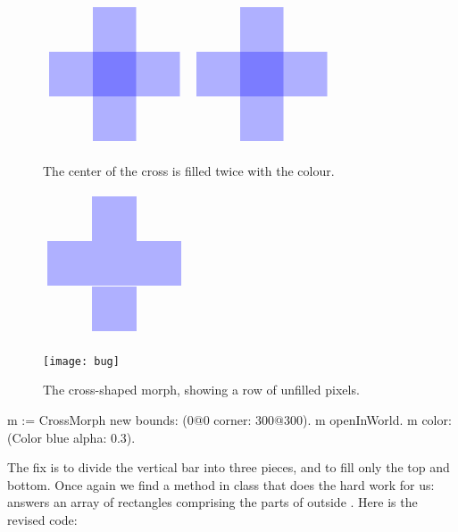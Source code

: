 \documentclass[a4paper,10pt,twoside]{book}
\begin{document}
\begin{figure}[t]
\begin{minipage}{0.48\textwidth}
	\ifluluelse
		{\centerline{\includegraphics[scale=0.6]{overdrawBug}}}
		{\centerline{\includegraphics{overdrawBug}}}
	\caption{The center of the cross is filled twice with the colour.
		\label{fig:overdrawBug}}
\end{minipage}
\hfill
\begin{minipage}{0.48\textwidth}
	\ifluluelse
		{\centerline{\includegraphics[scale=0.6]{hairlineBug}}}
		{\centerline{\texttt{[image: bug]}}}
	\caption{The cross-shaped morph, showing a row of unfilled pixels.
		\label{fig:bug}}
\end{minipage}
\end{figure}


\begin{code}{}
m := CrossMorph new bounds: (0@0 corner: 300@300).
m openInWorld.
m color: (Color blue alpha: 0.3).

\end{code}

\noindent
The fix is to divide the vertical bar into three pieces, and to fill only the top and bottom.  
Once again we find a method in class  that does the hard work for us:  answers an array of rectangles comprising the parts of  outside .
Here is the revised code:
\end{document}
